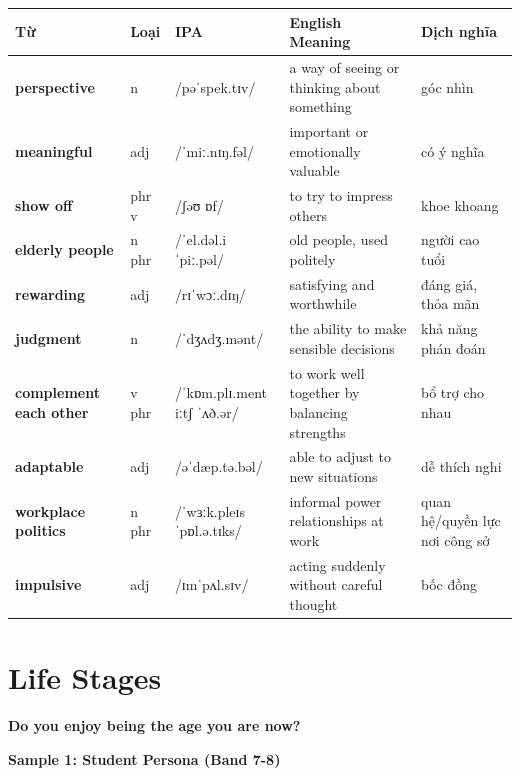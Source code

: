 \vspace{0.8em}
\begin{center}
\renewcommand{\arraystretch}{1.65}
\begin{tabularx}{\textwidth}{|V{0.22\textwidth}|C{0.07\textwidth}|I{0.20\textwidth}|Y|V{0.18\textwidth}|}
\hline
{}
\textbf{Từ} & \textbf{Loại} & \textbf{IPA} & \textbf{English Meaning} & \textbf{Dịch nghĩa} \\
\hline
\textbf{perspective} & n & /pəˈspek.tɪv/ & a way of seeing or thinking about something & góc nhìn \\ \hline
\textbf{meaningful} & adj & /ˈmiː.nɪŋ.fəl/ & important or emotionally valuable & có ý nghĩa \\ \hline
\textbf{show off} & phr v & /ʃəʊ ɒf/ & to try to impress others & khoe khoang \\ \hline
\textbf{elderly people} & n phr & /ˈel.dəl.i ˈpiː.pəl/ & old people, used politely & người cao tuổi \\ \hline
\textbf{rewarding} & adj & /rɪˈwɔː.dɪŋ/ & satisfying and worthwhile & đáng giá, thỏa mãn \\ \hline
\textbf{judgment} & n & /ˈdʒʌdʒ.mənt/ & the ability to make sensible decisions & khả năng phán đoán \\ \hline
\textbf{complement each other} & v phr & /ˈkɒm.plɪ.ment iːtʃ ˈʌð.ər/ & to work well together by balancing strengths & bổ trợ cho nhau \\ \hline
\textbf{adaptable} & adj & /əˈdæp.tə.bəl/ & able to adjust to new situations & dễ thích nghi \\ \hline
\textbf{workplace politics} & n phr & /ˈwɜːk.pleɪs ˈpɒl.ə.tɪks/ & informal power relationships at work & quan hệ/quyền lực nơi công sở \\ \hline
\textbf{impulsive} & adj & /ɪmˈpʌl.sɪv/ & acting suddenly without careful thought & bốc đồng \\ \hline
\end{tabularx}
\end{center}

\newpage

\section{Life Stages}
\begin{ieltsquestion}
\textbf{Do you enjoy being the age you are now?}
\end{ieltsquestion}
\textbf{Sample 1: Student Persona (Band 7-8)}

